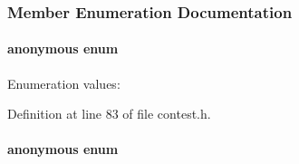 \subsubsection{Member Enumeration Documentation}
\hypertarget{classContest_Contests11}{
\paragraph["@1]{\setlength{\rightskip}{0pt plus 5cm}anonymous enum}\hfill}
\label{classContest_Contests11}


\begin{Desc}
\item[Enumeration values: ]\par
\begin{description}
\item[{\em 
\hypertarget{classContest_Contests11Contests0}{
{\em PORT\_\-NUM}}
\label{classContest_Contests11Contests0}
}]\end{description}
\end{Desc}



Definition at line 83 of file contest.h.\hypertarget{classContest_Contests12}{
\paragraph["@2]{\setlength{\rightskip}{0pt plus 5cm}anonymous enum}\hfill}
\label{classContest_Contests12}


